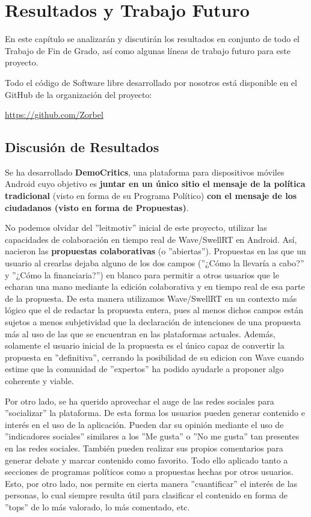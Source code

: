 \newpage
\thispagestyle{sectioned}
\chapter{Resultados y Trabajo Futuro}

En este capítulo se analizarán y discutirán los resultados en conjunto de todo el Trabajo de Fin de Grado, así como algunas líneas de trabajo futuro para este proyecto.

Todo el código de Software libre desarrollado por nosotros está disponible en el GitHub de la organización del proyecto:

\url{https://github.com/Zorbel}

\section{Discusión de Resultados}

Se ha desarrollado \textbf{DemoCritics}, una plataforma para dispositivos móviles Android cuyo objetivo es \textbf{juntar en un único sitio el mensaje de la política tradicional} (visto en forma de su Programa Político) \textbf{con el mensaje de los ciudadanos (visto en forma de Propuestas)}.

No podemos olvidar del ''leitmotiv'' inicial de este proyecto, utilizar las capacidades de colaboración en tiempo real de Wave/SwellRT en Android. Así, nacieron las \textbf{propuestas colaborativas} (o ''abiertas''). Propuestas en las que un usuario al crearlas dejaba alguno de los dos campos (''¿Cómo la llevaría a cabo?'' y ''¿Cómo la financiaria?'') en blanco para permitir a otros usuarios que le echaran una mano mediante la edición colaborativa y en tiempo real de esa parte de la propuesta. De esta manera utilizamos Wave/SwellRT en un contexto más lógico que el de redactar la propuesta entera, pues al menos dichos campos están sujetos a menos subjetividad que la declaración de intenciones de una propuesta más al uso de las que se encuentran en las plataformas actuales. Además, solamente el usuario inicial de la propuesta es el único capaz de convertir la propuesta en ''definitiva'', cerrando la posibilidad de su edicion con Wave cuando estime que la comunidad de ''expertos'' ha podido ayudarle a proponer algo coherente y viable. 

Por otro lado, se ha querido aprovechar el auge de las redes sociales para ''socializar'' la plataforma. De esta forma los usuarios pueden generar contenido e interés en el uso de la aplicación. Pueden dar su opinión mediante el uso de ''indicadores sociales'' similares a los ''Me gusta'' o ''No me gusta'' tan presentes en las redes sociales. También pueden realizar sus propios comentarios para generar debate y marcar contenido como favorito. Todo ello aplicado tanto a secciones de programas políticos como a propuestas hechas por otros usuarios. Esto, por otro lado, nos permite en cierta manera ''cuantificar'' el interés de las personas, lo cual siempre resulta útil para clasificar el contenido en forma de ''tops'' de lo más valorado, lo más comentado, etc. 

